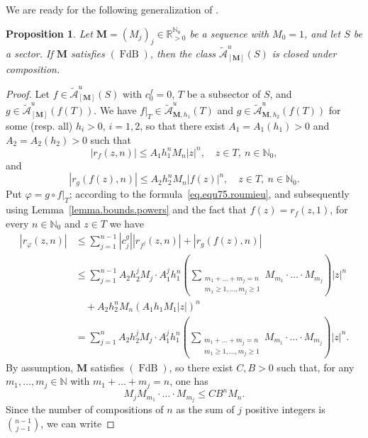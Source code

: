 \documentclass[11pt,a4paper]{article}
\theoremstyle{plain}
\newtheorem{proposition}{Proposition}[section]
\theoremstyle{definition}
\newcommand{\RR}{\mathbb{R}}
\newcommand{\NN}{\mathbb{N}}
\newcommand{\M}{\mathbf{M}}
\newcommand{\m}{\boldsymbol{m}}
\let\on=\operatorname
\begin{document}
We are ready for the following generalization of \cite[Thm. 6]{AubersonMennessier81}.


\begin{proposition}\label{prop.stablecomposition}
Let $\M=(M_j)_j\in\RR_{>0}^{\NN_0}$ be a sequence with $M_0=1$, and let $S$ be a sector. If $\M$ satisfies \hyperlink{s-FdB}{$(\on{FdB})$}, then the class $\mathcal{\widetilde{A}}^{u}_{[\M]}(S)$ is closed under composition. 
\end{proposition}
\begin{proof}
Let $f\in\mathcal{\widetilde{A}}^{u}_{[\M]}(S)$ with $c_0^f=0$, $T$ be a subsector of $S$, and  $g\in\mathcal{\widetilde{A}}^{u}_{[\M]}(f(T))$. We have $f|_T\in\mathcal{\widetilde{A}}^{u}_{\M,h_1}(T)$ and $g\in\mathcal{\widetilde{A}}^{u}_{\M,h_2}(f(T))$ for some (resp. all) $h_i>0$, $i=1,2$, so that there exist $A_1=A_1(h_1)>0$ and $A_2=A_2(h_2)>0$ such that
\begin{equation*}%
    |r_f(z,n)|\le A_1h_1^n M_n |z|^n,\quad z\in T,\ n\in\NN_0,
\end{equation*}
and
\begin{equation*}%
    |r_g(f(z),n)|\le A_2 h_2^n M_n |f(z)|^n,\quad z\in T,\ n\in\NN_0.
\end{equation*}
Put $\varphi=g\circ f|_T$; according to the formula~\eqref{eq.equ75.roumieu}, and subsequently using Lemma~\ref{lemma.bounds.powers} and the fact that $f(z)=r_f(z,1)$, for every $n\in\NN_0$ and $z\in T$ we have
\begin{align*}
|r_{\varphi}(z,n)|&\le\sum_{j=1}^{n-1}|c^g_j||r_{f^j}(z,n)|+|r_g(f(z),n)|\\
&\le \sum_{j=1}^{n-1} A_2 h_2^j M_j \cdot A_1^j h_1^n 
\left(\sum_{\substack{m_1+\dots+m_j=n\\m_1\ge 1,\dots,m_j\ge 1}}M_{m_1}\cdot\ldots \cdot M_{m_j}\right) |z|^n
\\
&\quad + A_2 h_2^n M_n \left( A_1 h_1 M_1 |z| \right)^n\\
&=\sum_{j=1}^{n} A_2 h_2^j M_j \cdot A_1^j h_1^n 
\left(\sum_{\substack{m_1+\dots+m_j=n\\m_1\ge 1,\dots,m_j\ge 1}}M_{m_1}\cdot\ldots \cdot M_{m_j}\right) |z|^n.
\end{align*}
By assumption, $\M$ satisfies \hyperlink{s-FdB}{$(\on{FdB})$}, so there exist $C,B>0$ such that, for any $m_1,\dots,m_j\in\NN$ with $m_1+\dots+m_j=n$, one has 
$$
M_jM_{m_1}\cdot\ldots \cdot M_{m_j}\le CB^nM_n.
$$
Since the number of compositions of $n$ as the sum of $j$ positive integers is  $\binom{n-1}{j-1}$, we can write

\end{proof}
\end{document}
